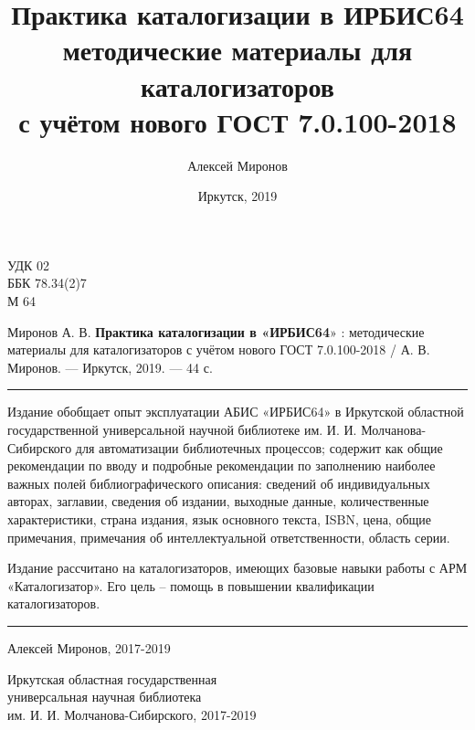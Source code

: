 \documentclass[a5paper,10pt]{book}
\begin{document}
\author{Алексей Миронов}
\title{Практика каталогизации в ИРБИС64 \\
	{\normalsize методические материалы для каталогизаторов \\
		с учётом нового ГОСТ 7.0.100-2018
	}
}
\date{Иркутск, 2019}

\frontmatter
\maketitle

\clearpage
\thispagestyle{empty}
\noindent УДК 02 \\
ББК 78.34(2)7 \\
М 64

\vspace{8mm}

Миронов А. В. \textbf{Практика каталогизации в «ИРБИС64}» : методические материалы для каталогизаторов с учётом нового ГОСТ 7.0.100-2018 / А. В. Миронов. — Иркутск, 2019. — 44 с.

\vspace{8mm}

\hrule\smallskip
Издание обобщает опыт эксплуатации АБИС «ИРБИС64» в Иркутской областной государственной универсальной научной библиотеке им. И. И. Мол\-ча\-но\-ва-Сибирского для автоматизации библиотечных процессов; содержит как общие рекомендации по вводу и подробные рекомендации по заполнению наиболее важных полей библиографического описания: сведений об индивидуальных авторах, заглавии, сведения об издании, выходные данные, количественные характеристики, страна издания, язык основного текста, ISBN, цена, общие примечания, примечания об интеллектуальной ответственности, область серии.

\vspace{3mm}
Издание рассчитано на каталогизаторов, имеющих базовые навыки работы с АРМ «Каталогизатор». Его цель – помощь в повышении квалификации каталогизаторов.
\hrule

\vspace{4cm}

\begin{flushright}
\textcopyright Алексей Миронов, 2017-2019

\vspace{3mm}	

Иркутская областная государственная \\
универсальная научная библиотека \\
им. И. И. Молчанова-Сибирского, 2017-2019
\end{flushright}

\mainmatter














\backmatter
\end{document}
